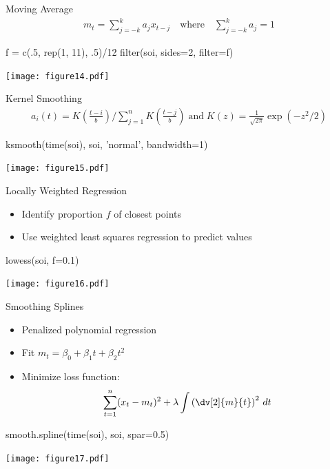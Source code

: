 \documentclass[ignorenonframetext,xcolor=x11names]{beamer}
\begin{document}
\begin{frame}[fragile]{Moving Average}
\begin{align*}m_t = \sum_{j=-k}^k a_j x_{t-j} \quad \text{where} \quad
\sum_{j=-k}^k a_j = 1
\end{align*}
\begin{Rcode}
f = c(.5, rep(1, 11), .5)/12
filter(soi, sides=2, filter=f)
\end{Rcode}
\begin{center}
\texttt{[image: figure14.pdf]}
\end{center}
\end{frame}

\begin{frame}[fragile]{Kernel Smoothing}
\begin{align*}a_i(t) = K\left(\frac{t-i}{b}\right) / \sum_{j=1}^n K \left(\frac{t-j}{b}\right) \; \text{and} \; K(z) = \frac{1}{\sqrt{2\pi}} \exp(-z^2/2) \end{align*}
\begin{Rcode}
ksmooth(time(soi), soi, 'normal', bandwidth=1)
\end{Rcode}
\begin{center}
\texttt{[image: figure15.pdf]}
\end{center}
\end{frame}

\begin{frame}[fragile]{Locally Weighted Regression}
\begin{itemize}
   \item Identify proportion $f$ of closest points
   \item Use weighted least squares regression to predict values
\end{itemize}
\begin{Rcode}
lowess(soi, f=0.1)
\end{Rcode}
\begin{center}
\texttt{[image: figure16.pdf]}
\end{center}
\end{frame}

\begin{frame}[fragile]{Smoothing Splines}
\begin{itemize}
  \item Penalized polynomial regression
  \item Fit $m_t = \beta_0 + \beta_1 t + \beta_2 t^2$
  \item Minimize loss function:
\begin{align*}
\sum_{t=1}^n (x_t - m_t)^2 + \lambda \int \left( \dv[2]{m}{t} \right)^2 \, dt
\end{align*}
\end{itemize}
\begin{Rcode}
smooth.spline(time(soi), soi, spar=0.5)
\end{Rcode}
\vspace{-1.5\baselineskip}
\begin{center}
\texttt{[image: figure17.pdf]}
\end{center}
\end{frame}
\end{document}
